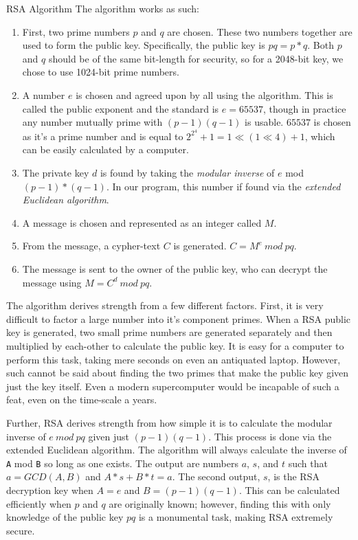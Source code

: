 \documentclass[landscape,a0paper,fontscale=.46]{baposter} %
\begin{document}
\begin{poster}
\begin{posterbox}[name=rsa,column=1,row=0,span=2]{RSA Algorithm}
The algorithm works as such:
\begin{enumerate}
	\item First, two prime numbers $p$ and $q$ are chosen. These two numbers together are used to form the public key. Specifically, the public key is ${pq = p * q}$. Both $p$ and $q$ should be of the same bit-length for security, so for a 2048-bit key, we chose to use 1024-bit prime numbers. 
	\item A number $e$ is chosen and agreed upon by all using the algorithm. This is called the public exponent and the standard is $e = 65537$, though in practice any number mutually prime with ${(p-1)(q-1)}$ is usable. $65537$ is chosen as it's a prime number and is equal to ${2^{2^4}+1 = 1 \ll (1 \ll 4) + 1}$, which can be easily calculated by a computer.
	\item The private key $d$ is found by taking the \emph{modular inverse} of $e$ mod ${(p-1)*(q-1)}$. In our program, this number if found via the \emph{extended Euclidean algorithm}.
	\item A message is chosen and represented as an integer called $M$.
	\item From the message, a cypher-text $C$ is generated. $C = M^e\ mod\ pq$.
	\item The message is sent to the owner of the public key, who can decrypt the message using $M = C^d\ mod\ pq$.
\end{enumerate}

The algorithm derives strength from  a few different factors. First, it is very difficult to factor a large number into it's component primes. When a RSA public key is generated, two small prime numbers are generated separately and then multiplied by each-other to calculate the public key. It is easy for a computer to perform this task, taking mere seconds on even an antiquated laptop. However, such cannot be said about finding the two primes that make the public key given just the key itself. Even a modern supercomputer would be incapable of such a feat, even on the time-scale a years.

Further, RSA derives strength from how simple it is to calculate the modular inverse of $e\ mod\ pq$ given just $(p-1)(q-1)$. This process is done via the extended Euclidean algorithm. The algorithm will always calculate the inverse of \verb|A| mod \verb|B| so long as one exists. The output are numbers $a$, $s$, and $t$ such that $a = GCD(A,B)$ and $A*s + B*t = a$. The second output, $s$, is the RSA decryption key when $A=e$ and ${B=(p-1)(q-1)}$. This can be calculated efficiently when $p$ and $q$ are originally known; however, finding this with only knowledge of the public key $pq$ is a monumental task, making RSA extremely secure.  
\end{posterbox}


\end{poster}
\end{document}

